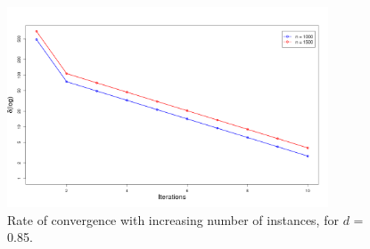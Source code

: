 \begin{figure}[h]
\centering
\includegraphics[width=0.85\textwidth]{media/chapter6/convergence-with-node-change.png}
\caption{Rate of convergence with increasing number of instances, for $d$ = 0.85.}
\label{fig:convergences-inreasing-nodes}
\end{figure}


